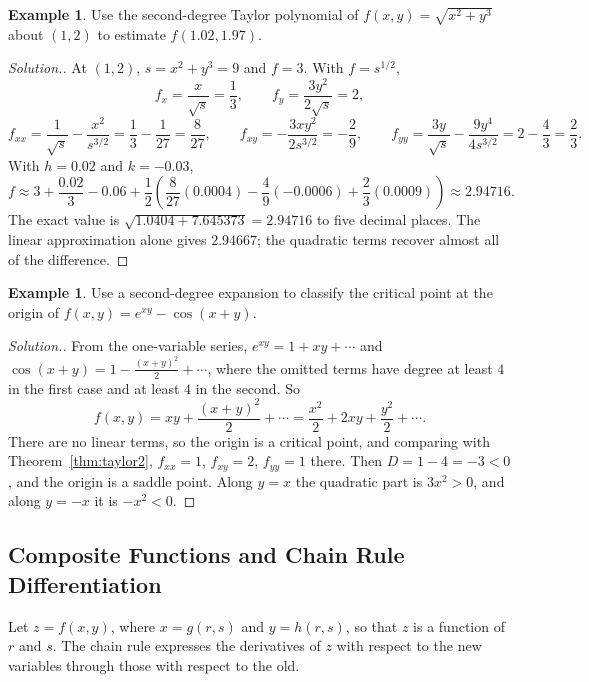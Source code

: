\documentclass[11pt,a4paper]{article}
\theoremstyle{definition}
\newtheorem{exa}[thm]{Example}
\newenvironment{solution}
  {\renewcommand{\qedsymbol}{}\begin{proof}[\textit{Solution}.]}
  {\end{proof}}
\begin{document}
\begin{exa}
\label{ex:taylorestimate}
Use the second-degree Taylor polynomial of $f(x,y) = \sqrt{x^2 + y^3}$ about
$(1,2)$ to estimate $f(1.02, 1.97)$.
\end{exa}

\begin{solution}
At $(1,2)$, $s = x^2 + y^3 = 9$ and $f = 3$. With $f = s^{1/2}$,
\[f_x = \frac{x}{\sqrt s} = \frac13,\qquad f_y = \frac{3y^2}{2\sqrt s} = 2,\]
\[f_{xx} = \frac{1}{\sqrt s} - \frac{x^2}{s^{3/2}} = \frac13 - \frac1{27} =
\frac{8}{27},\qquad f_{xy} = -\frac{3xy^2}{2s^{3/2}} = -\frac{2}{9},\qquad
f_{yy} = \frac{3y}{\sqrt s} - \frac{9y^4}{4s^{3/2}} = 2 - \frac43 = \frac23 .\]
With $h = 0.02$ and $k = -0.03$,
\[f\approx 3 + \frac{0.02}{3} - 0.06 + \frac12\left(\frac{8}{27}(0.0004) -
\frac{4}{9}(-0.0006) + \frac23(0.0009)\right)\approx 2.94716 .\]
The exact value is $\sqrt{1.0404 + 7.645373} = 2.94716$ to five decimal places.
The linear approximation alone gives $2.94667$; the quadratic terms recover
almost all of the difference.
\end{solution}

\begin{exa}
\label{ex:taylorclassify}
Use a second-degree expansion to classify the critical point at the origin of
$f(x,y) = e^{xy} - \cos(x+y)$.
\end{exa}

\begin{solution}
From the one-variable series,
$e^{xy} = 1 + xy + \cdots$ and $\cos(x+y) = 1 - \frac{(x+y)^2}{2} + \cdots$,
where the omitted terms have degree at least $4$ in the first case and at
least $4$ in the second. So
\[f(x,y) = xy + \frac{(x+y)^2}{2} + \cdots = \frac{x^2}{2} + 2xy +
\frac{y^2}{2} + \cdots .\]
There are no linear terms, so the origin is a critical point, and comparing with
Theorem~\ref{thm:taylor2}, $f_{xx} = 1$, $f_{xy} = 2$, $f_{yy} = 1$ there. Then
$D = 1 - 4 = -3<0$, and the origin is a saddle point. Along $y = x$ the quadratic
part is $3x^2>0$, and along $y = -x$ it is $-x^2<0$.
\end{solution}

{\color[wave]{485}\subsection{Composite Functions and Chain Rule Differentiation}}

Let $z = f(x,y)$, where $x = g(r,s)$ and $y = h(r,s)$, so that $z$ is a function
of $r$ and $s$. The chain rule expresses the derivatives of $z$ with respect to
the new variables through those with respect to the old.
\end{document}
